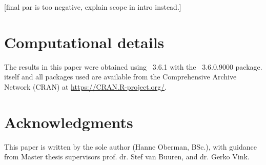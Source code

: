 \documentclass[article]{jss}
\begin{document}
[final par is too negative, explain scope in intro instead.]


\section*{Computational details}

The results in this paper were obtained using ~3.6.1 with the ~3.6.0.9000 package.  itself and all packages used are available from the Comprehensive  Archive Network (CRAN) at \url{https://CRAN.R-project.org/}.


\section*{Acknowledgments}

This paper is written by the sole author (Hanne Oberman, BSc.), with guidance from Master thesis supervisors prof. dr. Stef van Buuren, and dr. Gerko Vink.






\newpage

\begin{appendix}

\end{appendix}

\end{document}
